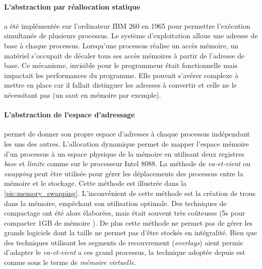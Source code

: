\paragraph{L'abstraction par réallocation statique} a été implémentée sur l'ordinateur IBM 260 en 1965 \cite{Britannica} pour permettre l'exécution simultanée de plusieurs processus. Le système d'exploitation alloue une adresse de base à chaque processus. Lorsqu'une processus réalise un accès mémoire, un matériel s'occupait de décaler tous ses accès mémoires à partir de l'adresse de base. Ce mécanisme, invisible pour le programmeur était fonctionnelle mais impactait les performances du programme. Elle pouvait s'avérer complexe à mettre en place car il fallait distinguer les adresses à convertir et celle ne le nécessitant pas (un saut en mémoire par exemple).

\paragraph{L'abstraction de l'espace d'adressage} permet de donner son propre espace d'adresses à chaque processus indépendant les uns des autres. L'allocation dynamique permet de mapper l'espace mémoire d'un processus à un espace physique de la mémoire en utilisant deux registres \textit{base} et \textit{limite} comme sur le processeur Intel  8088. La méthode de \textit{va-et-vient} ou \textit{swapping} peut être utilisée pour gérer les déplacements des processus entre la mémoire et le stockage. Cette méthode est illustrée dans la \autoref{pic:memory_swapping}. L'inconvénient de cette méthode est la création de trous dans la mémoire, empêchant son utilisation optimale.  Des techniques de compactage ont été alors élaborées, mais était souvent très coûteuses (5s pour compacter 1GB de mémoire \cite{tanenbaum2008systeme}). De plus cette méthode ne permet pas de gérer les grands logiciels dont la taille ne permet pas d'être stockés en intégralité. Bien que des techniques utilisant les segments de recouvrement (\textit{overlays}) \cite{sherman1992method} aient permis  d'adapter le \textit{va-et-vient} a ces grand processus, la technique adoptée depuis est connue sous le terme de \textit{mémoire virtuelle}.


